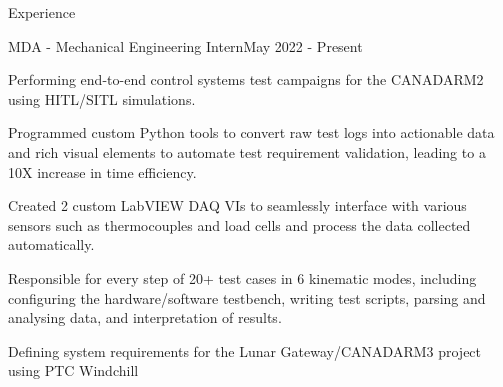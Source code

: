 \documentclass{resume} %
\begin{document}

\begin{rSection}{Experience}

\begin{rSubsection}{MDA - Mechanical Engineering Intern}{May 2022 - Present}{}{}

\item Performing end-to-end control systems test campaigns for the CANADARM2 using HITL/SITL simulations.
\item Programmed custom Python tools to convert raw test logs into actionable data and rich visual elements to automate test requirement validation, leading to a 10X increase in time efficiency.
\item Created 2 custom LabVIEW DAQ VIs to seamlessly interface with various sensors such as thermocouples and load cells and process the data collected automatically.
\item Responsible for every step of 20+ test cases in 6 kinematic modes, including configuring the hardware/software testbench, writing test scripts, parsing and analysing data, and interpretation of results.
\item Defining system requirements for the Lunar Gateway/CANADARM3 project using PTC Windchill

\end{rSubsection}

\begin{comment}

\begin{rSubsection}{Propulsion and Payload Engineer}{September 2021 - Present}{Queen's Rocket Engineering Team}{}
\item Designing the team's first 3D-printed Hybrid Rocket Engine to compete in the SA Cup 10,000ft SRAD category
\item Created Standard Operating Procedures (SOP) documentation in LaTeX for the safe operation of a cold-flow and hot-fire test, complete with hazard assessment, risk mitigation, and contingency planning
\item Designing an autonomous glider payload to be launched from the rocket at apogee and collect atmospheric data, controlled by ArduPilot


\end{comment}
\end{rSection}
\end{document}
